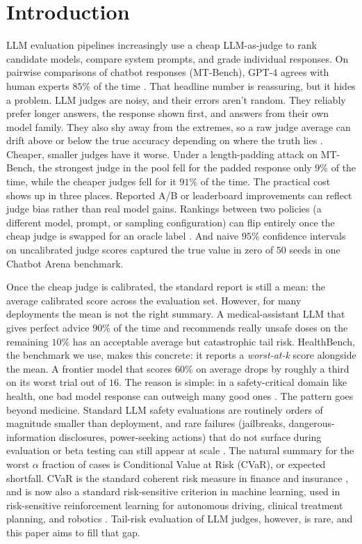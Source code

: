 \section{Introduction}
\label{sec:intro}

LLM evaluation pipelines increasingly use a cheap LLM-as-judge to rank
candidate models, compare system prompts, and grade individual responses.
On pairwise comparisons of chatbot responses (MT-Bench), GPT-4 agrees
with human experts $85\%$ of the time \citep{Zheng2023Judging}. That
headline number is reassuring, but it hides a problem. LLM judges are
noisy, and their errors aren't random. They reliably prefer longer
answers, the response shown first, and answers from their own model
family. They also shy away from the extremes,
so a raw judge average can drift above or below the true accuracy
depending on where the truth lies
\citep{Lee2025LLMJudgeReporting,Chen2026EfficientLLMJudge}. Cheaper,
smaller judges have it worse. Under a length-padding attack on MT-Bench,
the strongest judge in the pool fell for the padded response only
$9\%$ of the time, while the cheaper judges fell for it $91\%$ of the
time. The practical cost shows up in three
places. Reported A/B or leaderboard improvements can reflect judge bias
rather than real model gains. Rankings
between two policies (a different model, prompt, or sampling
configuration) can flip entirely once the cheap judge is swapped for
an oracle label \citep{LandesbergNarayan2026CJE}. And
naive $95\%$ confidence intervals on uncalibrated judge scores captured
the true value in zero of $50$ seeds in one Chatbot Arena benchmark.

Once the cheap judge is calibrated, the standard report is still a
mean: the average calibrated score across the evaluation set.
However, for many deployments the mean is not the right summary. A
medical-assistant LLM that gives perfect advice $90\%$ of the time and
recommends really unsafe doses on the remaining $10\%$ has an
acceptable average but catastrophic tail risk. HealthBench, the
benchmark we use, makes this concrete: it reports a \emph{worst-at-k}
score alongside the mean. A frontier model that scores $60\%$ on
average drops by roughly a third on its worst trial out of $16$. The
reason is simple: in a safety-critical domain like health, one bad
model response can outweigh many good ones
\citep{OpenAI2025HealthBench}. The pattern goes beyond medicine.
Standard LLM safety evaluations are routinely orders of magnitude
smaller than deployment, and rare failures (jailbreaks,
dangerous-information disclosures, power-seeking actions) that do not
surface during evaluation or beta testing can still appear at scale
\citep{Jones2025RareLLMBehaviors}. The natural summary for the worst
$\alpha$ fraction of cases is Conditional Value at Risk (CVaR), or
expected shortfall. CVaR is the standard coherent risk measure in
finance and insurance
\citep{AcerbiTasche2002}, and is now also a
standard risk-sensitive criterion in machine learning, used in
risk-sensitive reinforcement learning for autonomous driving, clinical
treatment planning, and robotics \citep{Du2023IteratedCVaR}.
Tail-risk evaluation of LLM judges, however, is rare, and this paper
aims to fill that gap.

